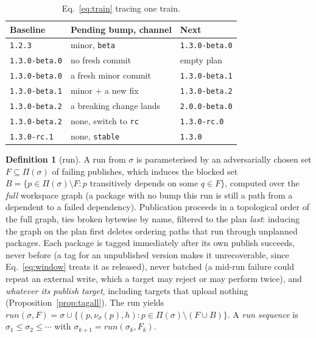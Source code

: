 \documentclass[10pt,conference]{IEEEtran}
\theoremstyle{definition}
\newtheorem{definition}{Definition}
\newcommand{\code}[1]{\texttt{#1}}
\begin{document}
\begin{table}[t]
\caption{Eq.~\ref{eq:train} tracing one train.}
\label{tab:train}
\small
\begin{tabular}{@{}lll@{}}
\toprule
Baseline & Pending bump, channel & Next \\
\midrule
\code{1.2.3}        & minor, \code{beta}          & \code{1.3.0-beta.0} \\
\code{1.3.0-beta.0} & no fresh commit             & empty plan \\
\code{1.3.0-beta.0} & a fresh minor commit        & \code{1.3.0-beta.1} \\
\code{1.3.0-beta.1} & minor $+$ a new fix         & \code{1.3.0-beta.2} \\
\code{1.3.0-beta.2} & a breaking change lands     & \code{2.0.0-beta.0} \\
\code{1.3.0-beta.2} & none, switch to \code{rc}   & \code{1.3.0-rc.0} \\
\code{1.3.0-rc.1}   & none, \code{stable}         & \code{1.3.0} \\
\bottomrule
\end{tabular}
\end{table}

\begin{definition}[run]
\label{def:run}
A run from $\sigma$ is parameterised by an adversarially chosen set
$F \subseteq \Pi(\sigma)$ of failing publishes, which induces the
blocked set
$B = \{p \in \Pi(\sigma) \setminus F : p$ transitively depends on some
$q \in F\}$, computed over the \emph{full} workspace graph (a package
with no bump this run is still a path from a dependent to a failed
dependency). Publication proceeds in a topological order of the full
graph, ties broken bytewise by name, filtered to the plan \emph{last}:
inducing the graph on the plan first deletes ordering paths that run
through unplanned packages. Each package is tagged immediately after its
own publish succeeds, never before (a tag for an unpublished version
makes it unrecoverable, since Eq.~\ref{eq:window} treats it as
released), never batched (a mid-run failure could repeat an external write,
which a target may reject or may perform twice), and \emph{whatever its publish target},
including targets that upload nothing
(Proposition~\ref{prop:tagall}). The run yields
$\mathit{run}(\sigma,F) = \sigma \cup \{(p, \nu_\sigma(p), h) : p \in
\Pi(\sigma) \setminus (F \cup B)\}$. A \emph{run sequence} is
$\sigma_1 \leq \sigma_2 \leq \cdots$ with $\sigma_{k+1} =
\mathit{run}(\sigma_k, F_k)$.
\end{definition}
\end{document}
